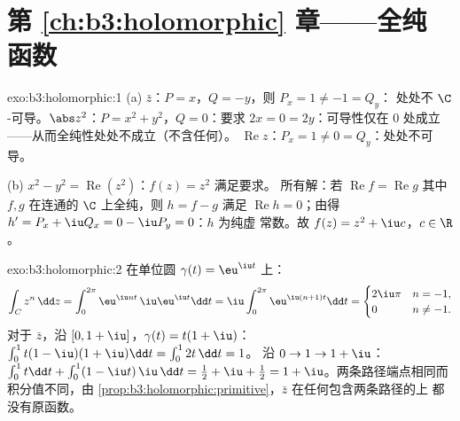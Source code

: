 \section*{第 \ref{ch:b3:holomorphic} 章——全纯
函数}

\begin{solution}{exo:b3:holomorphic:1}
(a) $\bar z$：$P = x$，$Q = -y$，则 $P_x = 1 \neq -1 = Q_y$：
处处不 $\C$-可导。$\abs z^2$：$P = x^2 + y^2$，$Q =
0$：要求 $2x = 0 = 2y$：可导性仅在
$0$ 处成立——从而全纯性处处不成立（不含任何）。
$\operatorname{Re}z$：$P_x = 1 \neq 0 = Q_y$：处处不可导。

(b) $x^2 - y^2 = \operatorname{Re}(z^2)$：$f(z) = z^2$ 满足要求。
所有解：若 $\operatorname{Re}f = \operatorname{Re}g$
其中 $f, g$ 在连通的 $\C$ 上全纯，则 $h = f -
g$ 满足 $\operatorname{Re}h = 0$；由得 $h' =
P_x + \iu Q_x = 0 - \iu P_y = 0$：$h$ 为纯虚
常数。故 $f(z) = z^2 + \iu c$，$c \in \R$。
\end{solution}

\begin{solution}{exo:b3:holomorphic:2}
在单位圆 $\gamma(t) = \eu^{\iu t}$ 上：
\[
\int_C z^n\,\dd z = \int_0^{2\pi}\eu^{\iu nt}\,\iu\eu^{\iu
t}\dd t = \iu\int_0^{2\pi}\eu^{\iu(n+1)t}\dd t
= \begin{cases} 2\iu\pi & n = -1,\\ 0 & n \neq -1.\end{cases}
\]
对于 $\bar z$，沿 $[0, 1+\iu]$，$\gamma(t) = t(1 + \iu)$：
$\int_0^1 t(1 - \iu)(1 + \iu)\dd t = \int_0^12t\,\dd t = 1$。
沿 $0 \to 1 \to 1 + \iu$：$\int_0^1t\dd t +
\int_0^1(1 - \iu t)\,\iu\,\dd t = \frac12 + \iu + \frac12 = 1
+ \iu$。两条路径端点相同而积分值不同，由
\cref{prop:b3:holomorphic:primitive}，$\bar z$ 在任何包含两条路径的上
都没有原函数。
\end{solution}

